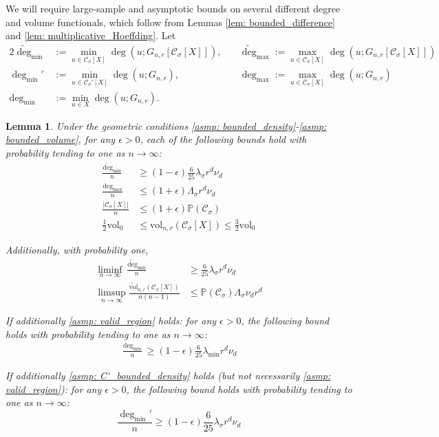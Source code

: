 \documentclass[11pt,twoside]{article}
\newtheorem{lemma}{Lemma}
\newcommand{\vol}{\mathrm{vol}}
\newcommand{\abs}[1]{\left \lvert #1 \right \rvert}
\newcommand{\1}{\mathbf{1}}
\newcommand{\Xbf}{X}             %
\newcommand{\Pbb}{\mathbb{P}}
\newcommand{\Cset}{\mathcal{C}}
\newcommand{\Csig}{\Cset_{\sigma}}
\newcommand{\degminpr}{\deg_{\min}'}
\newcommand{\degminwt}{\widetilde{\deg}_{\min}}
\newcommand{\degmaxwt}{\widetilde{\deg}_{\max}}
\newcommand{\degmax}{\deg_{\max}}
\newcommand{\degmin}{\deg_{\min}}
\begin{document}
We will require large-sample and asymptotic bounds on several different degree and volume functionals, which follow from Lemmas \ref{lem: bounded_difference} and \ref{lem: multiplicative_Hoeffding}. Let
\begin{alignat*}{2}
\degminwt & := \min_{u \in \Csig[\Xbf]} \deg(u; G_{n,r}\left[\Csig[\Xbf]\right]),~ && \degmaxwt := \max_{u \in \Csig[\Xbf]} \deg(u; G_{n,r}\left[\Csig[\Xbf]\right]) \\ 
\degminpr & := \min_{u \in \Csig'[\Xbf]} \deg(u; G_{n,r}),~ && \degmax := \max_{u \in \Csig[\Xbf]} \deg(u; G_{n,r}) \\
\degmin & := \min_{u \in \Xbf} \deg(u; G_{n,r}).
\end{alignat*}

\begin{lemma}
	\label{lem: ball_bounds_in_probability}
	Under the geometric conditions \ref{asmp: bounded_density}-\ref{asmp: bounded_volume}, for any $\epsilon > 0$, each of the following bounds hold with probability tending to one as $n \to \infty$:
	\begin{align}
	\frac{\degminwt}{n} & \geq (1 - \epsilon)\frac{6}{25} \lambda_{\sigma} r^d \nu_d \label{eqn: min_cluster_degree_bound} \\
	\frac{\degmax}{n} & \leq (1 + \epsilon)\Lambda_{\sigma} r^d \nu_d \label{eqn: max_degree_bound}\\
	\frac{\abs{\Csig[\Xbf]}}{n} & \leq (1 + \epsilon)\Pbb(\Csig) \label{eqn: Csig_cardinality_bound}\\
	\label{eqn: volwt_bound}
	\frac{1}{2}\vol_0 &\leq \vol_{n,r}(\Csig[\Xbf])  \leq \frac{3}{2} \vol_0
	\end{align}
	
	Additionally, with probability one,
	\begin{align}
	\liminf_{n \to \infty} \frac{\degminwt}{n} & \geq \frac{6}{25} \lambda_{\sigma} r^d \nu_d \label{eqn: min_cluster_degree_bound_asymp}\\
	\limsup_{n \to \infty} \frac{\widetilde{\vol}_{n,r}(\Csig[\Xbf])}{n(n-1)} & \leq \Pbb(\Csig) \Lambda_{\sigma} \nu_d r^d \label{eqn: max_vol_bound_asymp}
	\end{align}
	
	If additionally \ref{asmp: valid_region} holds: for any $\epsilon > 0$, the following bound holds with probability tending to one as $n \to \infty$:
	\begin{align}
	\frac{\degmin}{n} \geq (1 - \epsilon)\frac{6}{25}\lambda_{\min} r^d \nu_d \label{eqn: min_degree_bound} 
	\end{align}
	
	If additionally \ref{asmp: C'_bounded_density} holds (but not necessarily \ref{asmp: valid_region}): for any $\epsilon > 0$, the following bound holds with probability tending to one as $n \to \infty$:
	\begin{equation}
	\label{eqn: min_cluster_degree_bound_2}
	\frac{\degminpr}{n} \geq (1 - \epsilon)\frac{6}{25} \lambda_{\sigma} r^d \nu_d
	\end{equation}
\end{lemma}
\end{document}
